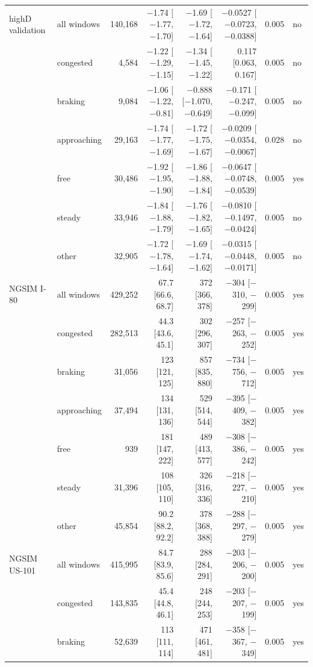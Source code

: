 \begin{longtable}{llrrrrrl}
\midrule
highD validation & all windows & 140,168 & $-$1.74 [$-$1.77, $-$1.70] & $-$1.69 [$-$1.72, $-$1.64] & $-$0.0527 [$-$0.0723, $-$0.0388] & 0.005 & no \\
 & congested & 4,584 & $-$1.22 [$-$1.29, $-$1.15] & $-$1.34 [$-$1.45, $-$1.22] & 0.117 [0.063, 0.167] & 0.005 & no \\
 & braking & 9,084 & $-$1.06 [$-$1.22, $-$0.81] & $-$0.888 [$-$1.070, $-$0.649] & $-$0.171 [$-$0.247, $-$0.099] & 0.005 & no \\
 & approaching & 29,163 & $-$1.74 [$-$1.77, $-$1.69] & $-$1.72 [$-$1.75, $-$1.67] & $-$0.0209 [$-$0.0354, $-$0.0067] & 0.028 & no \\
 & free & 30,486 & $-$1.92 [$-$1.95, $-$1.90] & $-$1.86 [$-$1.88, $-$1.84] & $-$0.0647 [$-$0.0748, $-$0.0539] & 0.005 & yes \\
 & steady & 33,946 & $-$1.84 [$-$1.88, $-$1.79] & $-$1.76 [$-$1.82, $-$1.65] & $-$0.0810 [$-$0.1497, $-$0.0424] & 0.005 & no \\
 & other & 32,905 & $-$1.72 [$-$1.78, $-$1.64] & $-$1.69 [$-$1.74, $-$1.62] & $-$0.0315 [$-$0.0448, $-$0.0171] & 0.005 & no \\
\midrule
NGSIM I-80 & all windows & 429,252 & 67.7 [66.6, 68.7] & 372 [366, 378] & $-$304 [$-$310, $-$299] & 0.005 & yes \\
 & congested & 282,513 & 44.3 [43.6, 45.1] & 302 [296, 307] & $-$257 [$-$263, $-$252] & 0.005 & yes \\
 & braking & 31,056 & 123 [121, 125] & 857 [835, 880] & $-$734 [$-$756, $-$712] & 0.005 & yes \\
 & approaching & 37,494 & 134 [131, 136] & 529 [514, 544] & $-$395 [$-$409, $-$382] & 0.005 & yes \\
 & free & 939 & 181 [147, 222] & 489 [413, 577] & $-$308 [$-$386, $-$242] & 0.005 & yes \\
 & steady & 31,396 & 108 [105, 110] & 326 [316, 336] & $-$218 [$-$227, $-$210] & 0.005 & yes \\
 & other & 45,854 & 90.2 [88.2, 92.2] & 378 [368, 388] & $-$288 [$-$297, $-$279] & 0.005 & yes \\
\midrule
NGSIM US-101 & all windows & 415,995 & 84.7 [83.9, 85.6] & 288 [284, 291] & $-$203 [$-$206, $-$200] & 0.005 & yes \\
 & congested & 143,835 & 45.4 [44.8, 46.1] & 248 [244, 253] & $-$203 [$-$207, $-$199] & 0.005 & yes \\
 & braking & 52,639 & 113 [111, 114] & 471 [461, 481] & $-$358 [$-$367, $-$349] & 0.005 & yes \\

\end{longtable}
